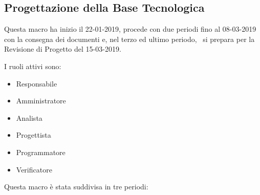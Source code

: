 		\newpage
		
        \subsection{Progettazione della Base Tecnologica}
		Questa macro ha inizio il 22-01-2019, procede con due periodi fino al 08-03-2019 con la consegna
		dei documenti e, nel terzo ed ultimo periodo, \gruppo\ si prepara per la Revisione di Progetto del 15-03-2019.
        
        I ruoli attivi sono: 
        \begin{itemize}
            \item Responsabile
            \item Amministratore
            \item Analista
            \item Progettista
            \item Programmatore
            \item Verificatore
        \end{itemize}
        Questa macro è stata suddivisa in tre periodi:
